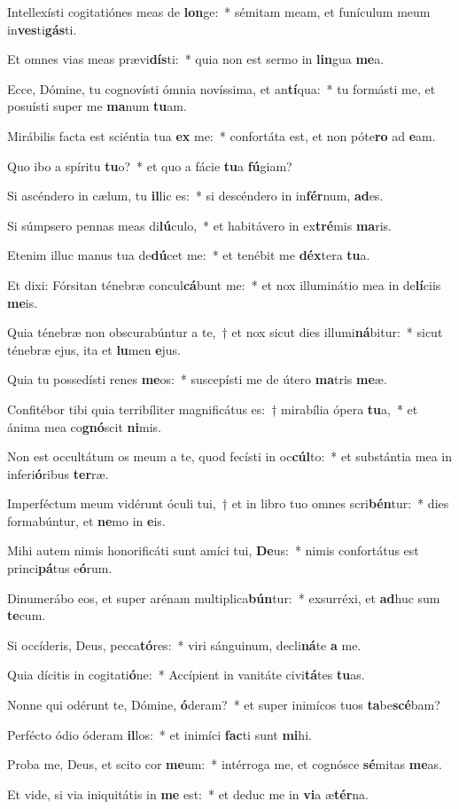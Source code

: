 \item Intellexísti cogitatiónes meas de \textbf{lon}ge:~* sémitam meam, et funículum meum in\textbf{ves}ti\textbf{gás}ti.
\item Et omnes vias meas prævi\textbf{dís}ti:~* quia non est sermo in \textbf{lin}gua \textbf{me}a.
\item Ecce, Dómine, tu cognovísti ómnia novíssima, et an\textbf{tí}qua:~* tu formásti me, et posuísti super me \textbf{ma}num \textbf{tu}am.
\item Mirábilis facta est sciéntia tua \textbf{ex} me:~* confortáta est, et non póte\textbf{ro} ad \textbf{e}am.
\item Quo ibo a spíritu \textbf{tu}o?~* et quo a fácie \textbf{tu}a \textbf{fú}giam?
\item Si ascéndero in cælum, tu \textbf{il}lic es:~* si descéndero in in\textbf{fér}num, \textbf{ad}es.
\item Si súmpsero pennas meas di\textbf{lú}culo,~* et habitávero in ex\textbf{tré}mis \textbf{ma}ris.
\item Etenim illuc manus tua de\textbf{dú}cet me:~* et tenébit me \textbf{déx}tera \textbf{tu}a.
\item Et dixi: Fórsitan ténebræ concul\textbf{cá}bunt me:~* et nox illuminátio mea in de\textbf{lí}ciis \textbf{me}is.
\item Quia ténebræ non obscurabúntur a te,~† et nox sicut dies illumi\textbf{ná}bitur:~* sicut ténebræ ejus, ita et \textbf{lu}men \textbf{e}jus.
\item Quia tu possedísti renes \textbf{me}os:~* suscepísti me de útero \textbf{ma}tris \textbf{me}æ.
\item Confitébor tibi quia terribíliter magnificátus es:~† mirabília ópera \textbf{tu}a,~* et ánima mea co\textbf{gnó}scit \textbf{ni}mis.
\item Non est occultátum os meum a te, quod fecísti in oc\textbf{cúl}to:~* et substántia mea in inferi\textbf{ó}ribus \textbf{ter}ræ.
\item Imperféctum meum vidérunt óculi tui,~† et in libro tuo omnes scri\textbf{bén}tur:~* dies formabúntur, et \textbf{ne}mo in \textbf{e}is.
\item Mihi autem nimis honorificáti sunt amíci tui, \textbf{De}us:~* nimis confortátus est princi\textbf{pá}tus e\textbf{ó}rum.
\item Dinumerábo eos, et super arénam multiplica\textbf{bún}tur:~* exsurréxi, et \textbf{ad}huc sum \textbf{te}cum.
\item Si occíderis, Deus, pecca\textbf{tó}res:~* viri sánguinum, decli\textbf{ná}te \textbf{a} me.
\item Quia dícitis in cogitati\textbf{ó}ne:~* Accípient in vanitáte civi\textbf{tá}tes \textbf{tu}as.
\item Nonne qui odérunt te, Dómine, \textbf{ó}deram?~* et super inimícos tuos \textbf{ta}be\textbf{scé}bam?
\item Perfécto ódio óderam \textbf{il}los:~* et inimíci \textbf{fac}ti sunt \textbf{mi}hi.
\item Proba me, Deus, et scito cor \textbf{me}um:~* intérroga me, et cognósce \textbf{sé}mitas \textbf{me}as.
\item Et vide, si via iniquitátis in \textbf{me} est:~* et deduc me in \textbf{vi}a æ\textbf{tér}na.
